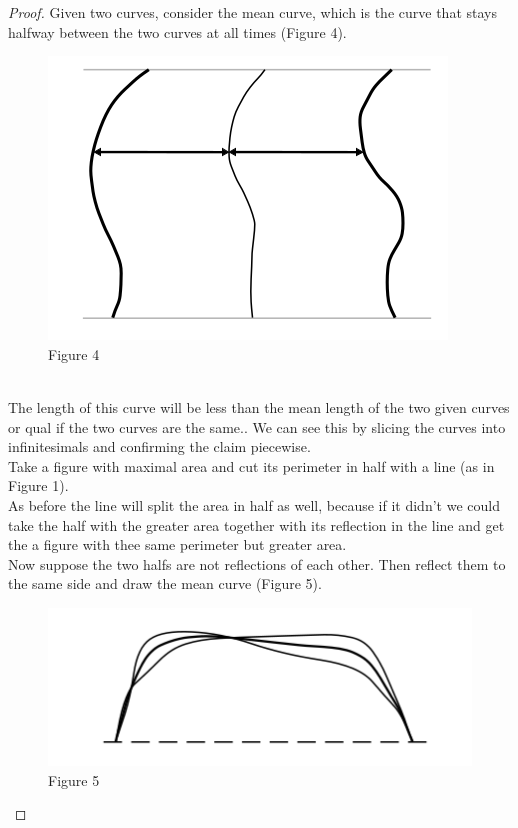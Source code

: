 \documentclass[12pt, a4paper, titlepage]{article}
\begin{document}
\begin{proof}
Given two curves, consider the mean curve, which is the curve that stays halfway between the two curves at all times (Figure 4). \\
\begin{figure}[h]
\includegraphics[scale=0.5]{images/Figure4}
\centering
Figure 4
\centering
\end{figure}
\\
The length of this curve will be less than the mean length of the two given curves or qual if the two curves are the same.. We can see this by slicing the curves into infinitesimals and confirming the claim piecewise.\\
Take a figure with maximal area and cut its perimeter in half with a line (as in Figure 1).\\
As before the line will split the area in half as well, because if it didn't we could take the half with the greater area together with its reflection in the line and get the a figure with thee same perimeter but greater area.\\
Now suppose the two halfs are not reflections of each other. Then reflect them to the same side and draw the mean curve (Figure 5).\\
\begin{figure}[h]
\includegraphics[scale=0.5]{images/Figure5}
\centering
Figure 5
\centering
\end{figure}

\end{proof}
\end{document}
